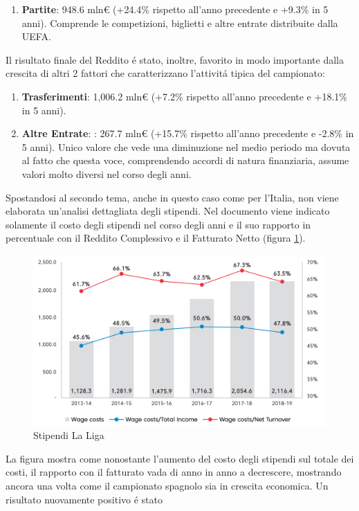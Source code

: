 \documentclass[
    corpo=12pt,
    oneside,
    evenboxes,
    tipotesi=triennale,
    stile=classica,
    oldstyle,
    autoretitolo,
    greek,
]{toptesi}
\begin{document}
\begin{interlinea}{1.5}
\begin{enumerate}
    pubblicit\'a e merchandising.
    \item \textbf{Partite}: 948.6 mln€ (+24.4\% rispetto all'anno precedente e +9.3\% in 5 anni). Comprende le competizioni, biglietti 
    e altre entrate distribuite dalla UEFA.
\end{enumerate}
Il risultato finale del Reddito \'e stato, inoltre, favorito in modo importante dalla crescita di altri 2 fattori che caratterizzano l'attivit\'a tipica del
campionato:
\begin{enumerate}
    \item \textbf{Trasferimenti}: 1,006.2 mln€ (+7.2\% rispetto all'anno precedente e +18.1\% in 5 anni).
    \item \textbf{Altre Entrate}: : 267.7 mln€ (+15.7\% rispetto all'anno precedente e -2.8\% in 5 anni). Unico valore che vede una diminuzione
    nel medio periodo ma dovuta al fatto che questa voce, comprendendo accordi di natura finanziaria, assume valori molto diversi nel corso degli anni.
\end{enumerate}
Spostandosi al secondo tema, anche in questo caso come per l'Italia, non viene elaborata un'analisi dettagliata degli stipendi. Nel documento
viene indicato solamente il costo degli stipendi nel corso degli anni e il suo rapporto in percentuale con il Reddito Complessivo e il Fatturato Netto
(figura \ref{wage_spain}).
\begin{figure}
    \centering
    \includegraphics[scale=.5]{img/wage_spain.png}
    \caption{Stipendi La Liga}
    \label{wage_spain}
\end{figure}
La figura mostra come nonostante l'aumento del costo degli stipendi sul totale dei costi, il rapporto con il fatturato vada di anno in anno
a decrescere, mostrando ancora una volta come il campionato spagnolo sia in crescita economica. Un risultato nuovamente positivo \'e stato

\end{interlinea}
\end{document}
